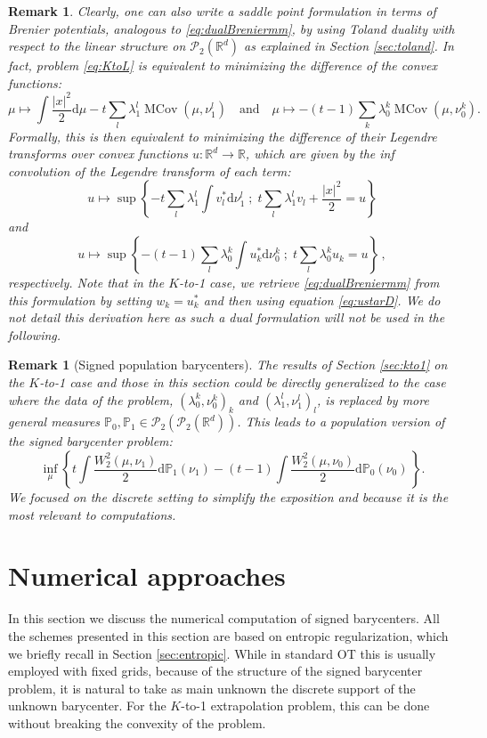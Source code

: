 \documentclass[12pt]{amsart}
\numberwithin{equation}{section}
\let\mc=\mathcal
\def\ed{\mathrm{d}}
\theoremstyle{plain}
\newtheorem{remark}[theorem]{Remark}
\theoremstyle{definition}
\begin{document}
\begin{remark}
Clearly, one can also write a saddle point formulation in terms of Brenier potentials, analogous to \eqref{eq:dualBreniermm}, by using Toland duality with respect to the linear structure on $\mc{P}_2(\mathbb{R}^d)$ as explained in Section \ref{sec:toland}. In fact, problem \eqref{eq:KtoL} is equivalent to minimizing the difference of the convex functions:
\[
\mu \mapsto \int \frac{|x|^2}{2}\ed \mu - t \sum_l \lambda^l_1 \operatorname{MCov}(\mu,\nu_1^l) \quad \text{and} \quad \mu \mapsto -(t-1)\sum_k \lambda_0^k \operatorname{MCov}(\mu,\nu_0^k).
\]
Formally, this is then equivalent to minimizing the difference of their Legendre transforms over convex functions $u:\mathbb{R}^d\rightarrow \mathbb{R}$, which are given by the inf convolution of the Legendre transform of each term:
\[
u \mapsto \sup \left\{ -t \sum_l \lambda_1^l\int v_l^* \ed \nu_1^l \;;\; t\sum_l \lambda_1^l v_l  + \frac{|x|^2}{2} =u \right\}
\]
and
\[
u \mapsto \sup \left\{ -(t-1) \sum_l \lambda_0^k \int u_k^* \ed \nu_0^k \;;\; t\sum_l \lambda_0^k u_k =u \right\}\,,
\] 
respectively. Note that in the $K$-to-1 case, we retrieve \eqref{eq:dualBreniermm} from this formulation by setting $w_k = u_k^*$ and then using equation \eqref{eq:ustarD}.
We do not detail this derivation here as such a dual formulation will not be used in the following. 
\end{remark}

\begin{remark}[Signed population barycenters] The results of Section \ref{sec:kto1} on the $K$-to-1 case and those in this section could be directly generalized to the case where the data of the problem, $(\lambda_0^k,\nu_0^k)_k$ and $(\lambda_1^l,\nu_1^l)_l$, is replaced by more general measures 
$\mathbb{P}_0,\mathbb{P}_1 \in \mc{P}_2(\mc{P}_2(\mathbb{R}^d))$. This leads to a population version of the signed barycenter problem:
\[
\inf_\mu \left\{ t \int \frac{W^2_2(\mu,\nu_1)}{2} \ed \mathbb{P}_1(\nu_1) - (t-1) \int \frac{W^2_2(\mu, \nu_0)}{2} \ed \mathbb{P}_0(\nu_0)\,\right\}.
\]
We focused on the discrete setting to simplify the exposition and because it is the most relevant to computations. 
\end{remark}

\section{Numerical approaches}\label{sec:numerical}
In this section we discuss the numerical computation of signed barycenters. All the schemes presented in this section are based on entropic regularization, which we briefly recall in Section \ref{sec:entropic}. While in standard OT this is usually employed with fixed grids, because of the structure of the signed barycenter problem, it is natural to take as main unknown the discrete support of the unknown barycenter. For the $K$-to-1 extrapolation problem,  this can be done without breaking the convexity of the problem. 
\end{document}
